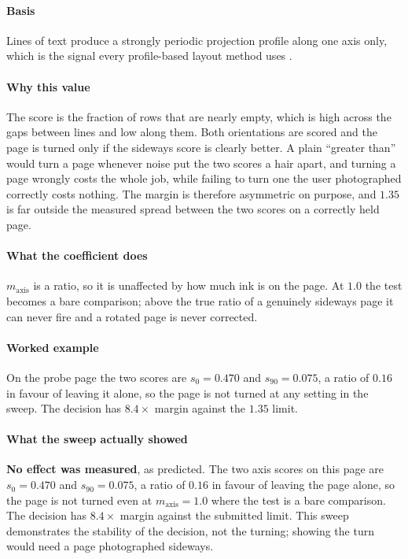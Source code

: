 \paragraph{Basis}

Lines of text produce a strongly periodic projection profile along one axis only, which is the signal every profile-based layout method uses \cite{likforman2007,shafait2008}.

\paragraph{Why this value}

The score is the fraction of rows that are nearly empty, which is high across the gaps between lines and low along them. Both orientations are scored and the page is turned only if the sideways score is clearly better. A plain \enquote{greater than} would turn a page whenever noise put the two scores a hair apart, and turning a page wrongly costs the whole job, while failing to turn one the user photographed correctly costs nothing. The margin is therefore asymmetric on purpose, and $1.35$ is far outside the measured spread between the two scores on a correctly held page.

\paragraph{What the coefficient does}

$m_{\text{axis}}$ is a ratio, so it is unaffected by how much ink is on the page. At $1.0$ the test becomes a bare comparison; above the true ratio of a genuinely sideways page it can never fire and a rotated page is never corrected.

\paragraph{Worked example}

On the probe page the two scores are $s_0 = 0.470$ and $s_{90} = 0.075$, a ratio of $0.16$ in favour of leaving it alone, so the page is not turned at any setting in the sweep. The decision has $8.4\times$ margin against the $1.35$ limit.

\paragraph{What the sweep actually showed}

\textbf{No effect was measured}, as predicted. The two axis scores on this page are $s_0 = 0.470$ and $s_{90} = 0.075$, a ratio of $0.16$ in favour of leaving the page alone, so the page is not turned even at $m_{\text{axis}} = 1.0$ where the test is a bare comparison. The decision has $8.4\times$ margin against the submitted limit. This sweep demonstrates the stability of the decision, not the turning; showing the turn would need a page photographed sideways.

